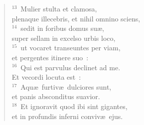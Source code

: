 \begin{flushleft}\begin{verse}${}^{13}$~Mulier stulta et clamosa,\\ plenaque illecebris, et nihil omnino sciens,\\
${}^{14}$~sedit in foribus domus su\ae ,\\ super sellam in excelso urbis loco,\\
${}^{15}$~ut vocaret transeuntes per viam,\\ et pergentes itinere suo~:\\
${}^{16}$~Qui est parvulus declinet ad me.\\ Et vecordi locuta est~:\\
${}^{17}$~Aqu\ae\ furtiv\ae\ dulciores sunt,\\ et panis absconditus suavior.\\
${}^{18}$~Et ignoravit quod ibi sint gigantes,\\ et in profundis inferni conviv\ae\ ejus.\end{verse}\end{flushleft}


